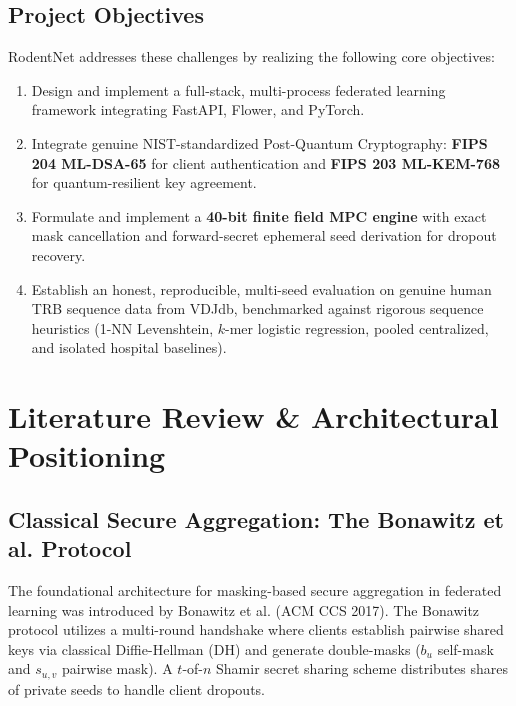 \documentclass[11pt,a4paper]{report}
\begin{document}
\section{Project Objectives}
RodentNet addresses these challenges by realizing the following core objectives:
\begin{enumerate}[itemsep=2pt]
  \item Design and implement a full-stack, multi-process federated learning framework integrating FastAPI, Flower, and PyTorch.
  \item Integrate genuine NIST-standardized Post-Quantum Cryptography: \textbf{FIPS 204 ML-DSA-65} for client authentication and \textbf{FIPS 203 ML-KEM-768} for quantum-resilient key agreement.
  \item Formulate and implement a \textbf{40-bit finite field MPC engine} with exact mask cancellation and forward-secret ephemeral seed derivation for dropout recovery.
  \item Establish an honest, reproducible, multi-seed evaluation on genuine human TRB sequence data from VDJdb, benchmarked against rigorous sequence heuristics (1-NN Levenshtein, $k$-mer logistic regression, pooled centralized, and isolated hospital baselines).
\end{enumerate}

\chapter{Literature Review \& Architectural Positioning}
\label{chap:literature}

\section{Classical Secure Aggregation: The Bonawitz et al. Protocol}
The foundational architecture for masking-based secure aggregation in federated learning was introduced by Bonawitz et al. (ACM CCS 2017). The Bonawitz protocol utilizes a multi-round handshake where clients establish pairwise shared keys via classical Diffie-Hellman (DH) and generate double-masks ($b_u$ self-mask and $s_{u,v}$ pairwise mask). A $t$-of-$n$ Shamir secret sharing scheme distributes shares of private seeds to handle client dropouts.
\end{document}
